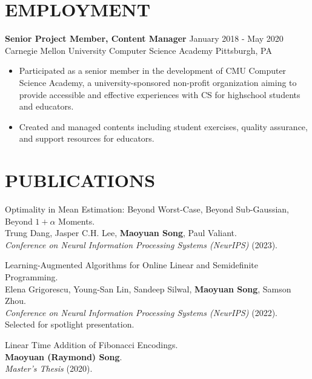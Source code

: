 \documentclass[margin, 10pt]{res} %
\begin{document}
\begin{resume}
\section{EMPLOYMENT}

{\bf Senior Project Member, Content Manager} \hfill January 2018 - May 2020 \\
Carnegie Mellon University Computer Science Academy \hfill Pittsburgh, PA

\begin{itemize}
\item Participated as a senior member in the development of CMU Computer Science Academy, a university-sponsored non-profit organization aiming to provide accessible and effective experiences with CS for highschool students and educators.
\item Created and managed contents including student exercises, quality assurance, and support resources for educators.
\end{itemize} 


\section{PUBLICATIONS}
\begin{etaremune}
\item Optimality in Mean Estimation: Beyond Worst-Case, Beyond Sub-Gaussian, Beyond $1 + \alpha$ Moments.\\
Trung Dang, Jasper C.H. Lee, {\bf Maoyuan Song}, Paul Valiant.\\
\emph{Conference on Neural Information Processing Systems (NeurIPS)} (2023).
\item Learning-Augmented Algorithms for Online Linear and Semidefinite Programming.\\
Elena Grigorescu, Young-San Lin, Sandeep Silwal, {\bf Maoyuan Song}, Samson Zhou.\\
\emph{Conference on Neural Information Processing Systems (NeurIPS)} (2022). Selected for spotlight presentation.
\item Linear Time Addition of Fibonacci Encodings.\\
{\bf Maoyuan (Raymond) Song}.\\
\emph{Master's Thesis} (2020). 
\end{etaremune}



\end{resume}
\end{document}
